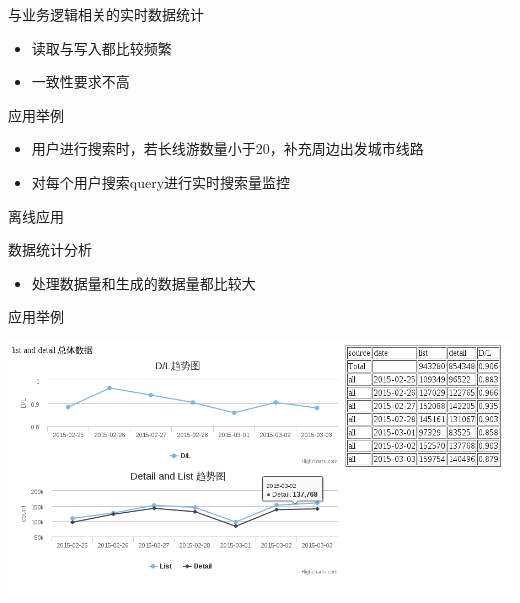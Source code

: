 \documentclass{beamer}
\begin{document}
\begin{CJK}{UTF8}{gbsn}
\begin{frame}{}
  \begin{block}{与业务逻辑相关的实时数据统计}
    \begin{itemize}
      \item {读取与写入都比较频繁}
      \item {一致性要求不高}
    \end{itemize}
  \end{block}
  \pause
  \begin{block}{应用举例}
    \begin{itemize}
      \item {用户进行搜索时，若长线游数量小于20，补充周边出发城市线路}
      \item {对每个用户搜索query进行实时搜索量监控}
    \end{itemize}
  \end{block}
\end{frame}

\begin{frame}{离线应用}
  \begin{block}{数据统计分析}
    \begin{itemize}
      \item {处理数据量和生成的数据量都比较大}
    \end{itemize}
  \end{block}
  \pause
  \begin{block}{应用举例}
    \begin{center}
      \includegraphics[scale=0.2]{./images/search-dashboard}
    \end{center}
  \end{block}
\end{frame}




\end{CJK}
\end{document}
